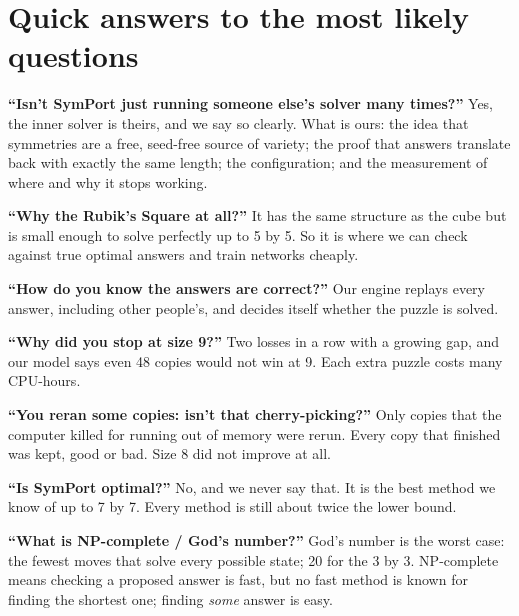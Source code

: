\documentclass[11pt,a4paper]{article}
\begin{document}
\newpage
\section{Quick answers to the most likely questions}
\textbf{``Isn't SymPort just running someone else's solver many times?''}
Yes, the inner solver is theirs, and we say so clearly. What is ours: the idea that symmetries are a free, seed-free source of
variety; the proof that answers translate back with exactly the same length; the configuration; and the measurement of where and
why it stops working.

\textbf{``Why the Rubik's Square at all?''}
It has the same structure as the cube but is small enough to solve perfectly up to 5 by 5. So it is where we can check against
true optimal answers and train networks cheaply.

\textbf{``How do you know the answers are correct?''}
Our engine replays every answer, including other people's, and decides itself whether the puzzle is solved.

\textbf{``Why did you stop at size 9?''}
Two losses in a row with a growing gap, and our model says even 48 copies would not win at 9. Each extra puzzle costs many
CPU-hours.

\textbf{``You reran some copies: isn't that cherry-picking?''}
Only copies that the computer killed for running out of memory were rerun. Every copy that finished was kept, good or bad. Size 8
did not improve at all.

\textbf{``Is SymPort optimal?''}
No, and we never say that. It is the best method we know of up to 7 by 7. Every method is still about twice the lower bound.

\textbf{``What is NP-complete / God's number?''}
God's number is the worst case: the fewest moves that solve every possible state; 20 for the 3 by 3. NP-complete means checking a
proposed answer is fast, but no fast method is known for finding the shortest one; finding \emph{some} answer is easy.
\end{document}
